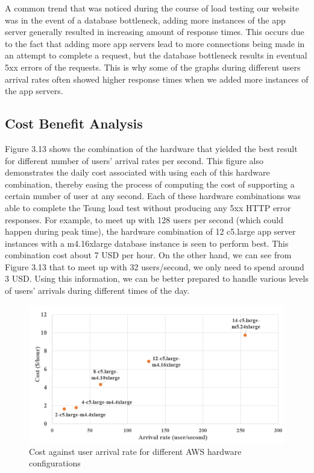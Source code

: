 A common trend that was noticed during the course of load testing our website was in the event of a database bottleneck, adding more instances of the app server generally resulted in increasing amount of response times. This occurs due to the fact that adding more app servers lead to more connections being made in an attempt to complete a request, but the database bottleneck results in eventual 5xx errors of the requests. This is why some of the graphs during different users arrival rates often showed higher response times when we added more instances of the app servers. 
\subsection {Cost Benefit Analysis}

Figure 3.13 shows the combination of the hardware that yielded the best result for different number of users' arrival rates per second. This figure also demonstrates the daily cost associated with using each of this hardware combination, thereby easing the process of computing the cost of supporting a certain number of user at any second. Each of these hardware combinations was able to complete the Tsung load test without producing any 5xx HTTP error responses. For example, to meet up with 128 users per second (which could happen during peak time), the hardware combination of 12 c5.large app server instances with a m4.16xlarge database instance is seen to perform best. This combination cost about 7 USD per hour. On the other hand, we can see from Figure 3.13 that to meet up with 32 users/second, we only need to spend around 3 USD. Using this information, we can be better prepared to handle various levels of users' arrivals during different times of the day.
\begin{figure}[h]
	\centering
	\includegraphics[width=1\textwidth]{images/cost.PNG}
	\caption{Cost against user arrival rate for different AWS hardware configurations}\label{fig:sqlopt}
\end{figure}


